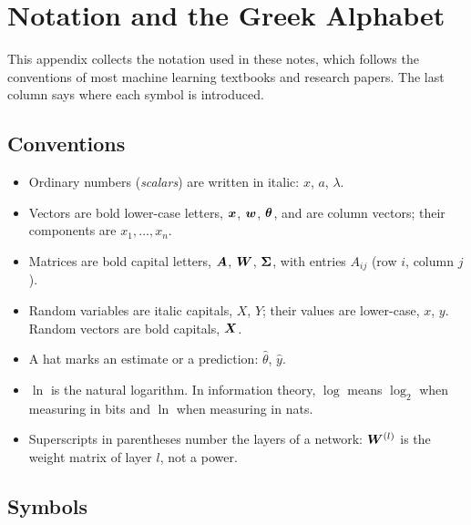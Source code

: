 \chapter{Notation and the Greek Alphabet}\label{app:notation}

This appendix collects the notation used in these notes, which follows the
conventions of most machine learning textbooks and research papers. The last
column says where each symbol is introduced.

\section*{Conventions}
{}

\begin{itemize}
  \item Ordinary numbers (\emph{scalars}) are written in italic: $x$, $a$, $\lambda$.
  \item Vectors are bold lower-case letters, $\bm{x}$, $\bm{w}$, $\bm{\theta}$, and are
    column vectors; their components are $x_1, \dots, x_n$.
  \item Matrices are bold capital letters, $\bm{A}$, $\bm{W}$, $\bm{\Sigma}$, with entries
    $A_{ij}$ (row $i$, column $j$).
  \item Random variables are italic capitals, $X$, $Y$; their values are lower-case,
    $x$, $y$. Random vectors are bold capitals, $\bm{X}$.
  \item A hat marks an estimate or a prediction: $\hat\theta$, $\hat y$.
  \item $\ln$ is the natural logarithm. In information theory, $\log$ means
    $\log_2$ when measuring in bits and $\ln$ when measuring in nats.
  \item Superscripts in parentheses number the layers of a network:
    $\bm{W}^{(l)}$ is the weight matrix of layer $l$, not a power.
\end{itemize}

\section*{Symbols}
{}

